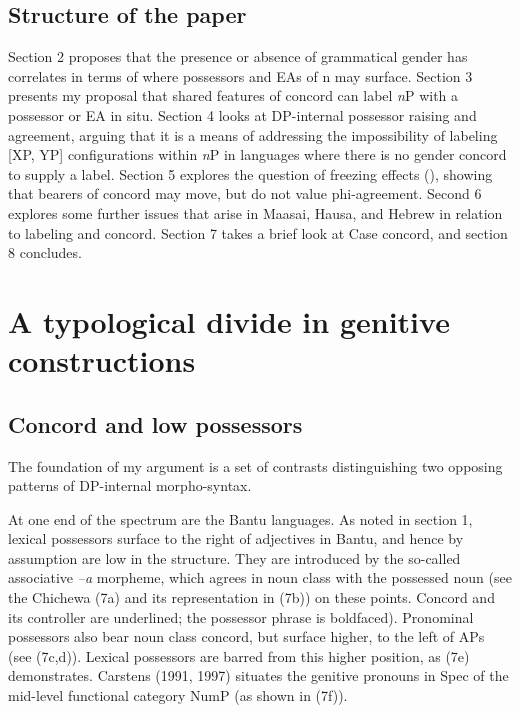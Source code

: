 \documentclass[output=paper
,modfonts
,nonflat]{langsci/langscibook}
\begin{document}
\subsection{Structure of the paper}
Section 2 proposes that the presence or absence of grammatical gender has correlates in terms of where possessors and EAs of n may surface. Section 3 presents my proposal that shared features of concord can label \textit{n}P with a possessor or EA in situ. Section 4 looks at DP-internal possessor raising and agreement, arguing that it is a means of addressing the impossibility of labeling [XP, YP] configurations within \textit{n}P in languages where there is no gender concord to supply a label. Section 5 explores the question of {\textquotedbl}freezing{\textquotedbl} effects (\citealt{Rizzi2006, Rizzi2007}), showing that bearers of concord may move, but do not value phi-agreement. Second 6 explores some further issues that arise in Maasai, Hausa, and Hebrew in relation to labeling and concord. Section 7 takes a brief look at Case concord, and section 8 concludes.

\section{A typological divide in genitive constructions}
\subsection{Concord and low possessors}
The foundation of my argument is a set of contrasts distinguishing two opposing patterns of DP-internal morpho-syntax. 

At one end of the spectrum are the Bantu languages. As noted in section 1, lexical possessors surface to the right of adjectives in Bantu, and hence by assumption are low in the structure. They are introduced by the so-called associative \textit{–a} morpheme, which agrees in noun class with the possessed noun (see the Chichewa (7a) and its representation in (7b)) on these points. Concord and its controller are underlined; the possessor phrase is boldfaced). Pronominal possessors also bear noun class concord, but surface higher, to the left of APs (see (7c,d)). Lexical possessors are barred from this higher position, as (7e) demonstrates. Carstens (1991, 1997) situates the genitive pronouns in Spec of the mid-level functional category NumP (as shown in (7f)).
\end{document}
